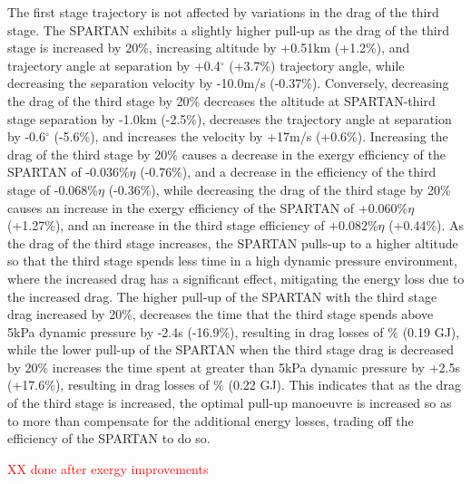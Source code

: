 The first stage trajectory is not affected by variations in the drag of the third stage. 
The SPARTAN exhibits a slightly higher pull-up as the drag of the third stage is increased by 20\%, increasing altitude by +0.51km (+1.2\%), and trajectory angle at separation by +0.4$^\circ$ (+3.7\%) trajectory angle, while decreasing the separation velocity by -10.0m/s (-0.37\%). Conversely, decreasing the drag of the third stage by 20\% decreases the altitude at SPARTAN-third stage separation by -1.0km (-2.5\%), decreases the trajectory angle at separation by -0.6$^\circ$ (-5.6\%), and increases the velocity by +17m/s (+0.6\%). 
Increasing the drag of the third stage by 20\% causes a decrease in the exergy efficiency of the SPARTAN of -0.036\%$\eta$ (-0.76\%), and a decrease in the efficiency of the third stage of -0.068\%$\eta$ (-0.36\%), while decreasing the drag of the third stage by 20\% causes an increase in the exergy efficiency of the SPARTAN of +0.060\%$\eta$ (+1.27\%), and an increase in the third stage efficiency of +0.082\%$\eta$ (+0.44\%). 
As the drag of the third stage increases, the SPARTAN pulls-up to a higher altitude so that the third stage spends less time in a high dynamic pressure environment, where the increased drag has a significant effect, mitigating the energy loss due to the increased drag. The higher pull-up of the SPARTAN with the third stage drag increased by 20\%, decreases the time that the third stage spends above 5kPa dynamic pressure by -2.4s (-16.9\%), resulting in drag losses of \WDthreeCdThreeOneHundredTwentyNoReturn\% (0.19 GJ), while the lower pull-up of the SPARTAN when the third stage drag is decreased by 20\% increases the time spent at greater than 5kPa dynamic pressure by +2.5s (+17.6\%), resulting in drag losses of \WDthreeCdThreeEightyNoReturn\% (0.22 GJ). This indicates that as the drag of the third stage is increased, the optimal pull-up manoeuvre is increased so as to more than compensate for the additional energy losses, trading off the efficiency of the SPARTAN to do so. 

\textcolor{red}{XX done after exergy improvements}



